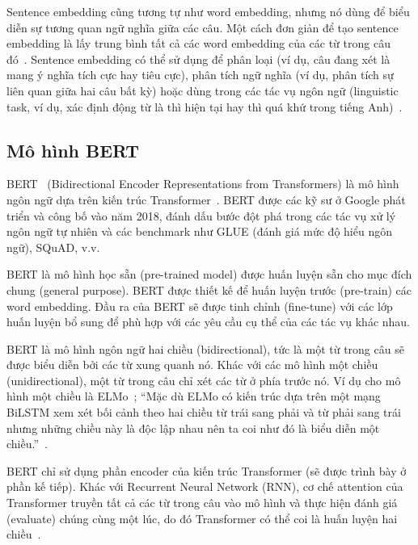 
Sentence embedding cũng tương tự như word embedding, nhưng nó dùng để biểu diễn sự tương quan ngữ nghĩa giữa các câu. Một cách đơn giản để tạo sentence embedding là lấy trung bình tất cả các word embedding của các từ trong câu đó~\cite{lamGomCumVan2021}. Sentence embedding có thể sử dụng để phân loại (ví dụ, câu đang xét là mang ý nghĩa tích cực hay tiêu cực), phân tích ngữ nghĩa (ví dụ, phân tích sự liên quan giữa hai câu bất kỳ) hoặc dùng trong các tác vụ ngôn ngữ (linguistic task, ví dụ, xác định động từ là thì hiện tại hay thì quá khứ trong tiếng Anh)~\cite{heidenreichPaperSummaryEvaluation2018}.

\subsection{Mô hình BERT}
BERT~\cite{devlinBERTPretrainingDeep2019} (Bidirectional Encoder Representations from Transformers) là mô hình ngôn ngữ dựa trên kiến trúc Transformer~\cite{vaswaniAttentionAllYou2017}. BERT được các kỹ sư ở Google phát triển và công bố vào năm 2018, đánh dấu bước đột phá trong các tác vụ xử lý ngôn ngữ tự nhiên và các benchmark như GLUE (đánh giá mức độ hiểu ngôn ngữ), SQuAD, v.v.

BERT là mô hình học sẵn (pre-trained model) được huấn luyện sẵn cho mục đích chung (general purpose). BERT được thiết kế để huấn luyện trước (pre-train) các word embedding. Đầu ra của BERT sẽ được tinh chỉnh (fine-tune) với các lớp huấn luyện bổ sung để phù hợp với các yêu cầu cụ thể của các tác vụ khác nhau.

BERT là mô hình ngôn ngữ hai chiều (bidirectional), tức là một từ trong câu sẽ được biểu diễn bởi các từ xung quanh nó. Khác với các mô hình một chiều (unidirectional), một từ trong câu chỉ xét các từ ở phía trước nó. Ví dụ cho mô hình một chiều là ELMo~\cite{petersDeepContextualizedWord2018}; ``Mặc dù ELMo có kiến trúc dựa trên một mạng BiLSTM xem xét bối cảnh theo hai chiều từ trái sang phải và từ phải sang trái nhưng những chiều này là độc lập nhau nên ta coi như đó là biểu diễn một chiều.''~\cite{khanhBERTModel2020}.

BERT chỉ sử dụng phần encoder của kiến trúc Transformer (sẽ được trình bày ở phần kế tiếp). Khác với Recurrent Neural Network (RNN), cơ chế attention của Transformer truyền tất cả các từ trong câu vào mô hình và thực hiện đánh giá (evaluate) chúng cùng một lúc, do đó Transformer có thể coi là huấn luyện hai chiều~\cite{khanhBERTModel2020}.

